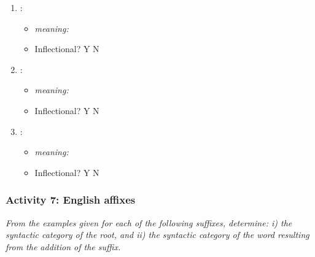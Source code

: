 \documentclass[11pt, oneside]{article}   	%
\begin{document}
\begin{enumerate}
	\begin{multicols}{3}
	\begin{enumerate}
	\item \underline{\hspace{1cm}}: 
		\begin{itemize}
		\item {\em meaning:} \underline{\hspace{1cm}}
		\item Inflectional? Y \hspace{0.5cm} N
		\end{itemize}
	\columnbreak
	\item \underline{\hspace{1cm}}:
		\begin{itemize}
		\item {\em meaning:} \underline{\hspace{1cm}}
		\item Inflectional? Y \hspace{0.5cm} N
		\end{itemize}
	\columnbreak
	\item \underline{\hspace{1cm}}:
		\begin{itemize}
		\item {\em meaning:} \underline{\hspace{1cm}}
		\item Inflectional? Y \hspace{0.5cm} N
		\end{itemize}
	\end{enumerate}
	\end{multicols}
\end{enumerate}

\newpage

\subsubsection{Activity 7: English affixes}

{\itshape From the examples given for each of the following suffixes, determine: i) the syntactic category of the root, and ii) the syntactic category of the word resulting from the addition of the suffix.} \\
\end{document}
